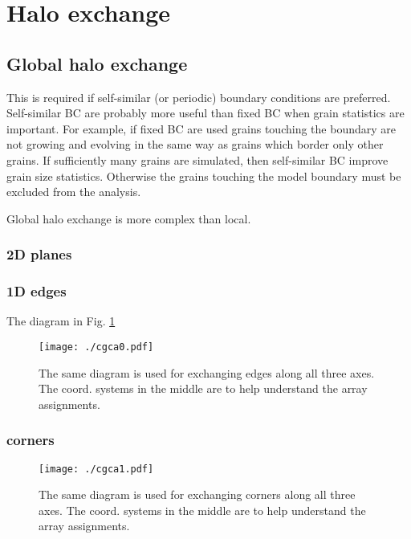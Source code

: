 \section{Halo exchange}

\subsection{Global halo exchange}

This is required if self-similar (or periodic) boundary
conditions are preferred.
Self-similar BC are probably more useful than
fixed BC when grain statistics are important.
For example, if fixed BC are used grains touching
the boundary are not growing and evolving in the
same way as grains which border only other grains.
If sufficiently many grains are simulated, then
self-similar BC improve grain size statistics.
Otherwise the grains touching the model boundary
must be excluded from the analysis.

Global halo exchange is more complex than local.

\subsubsection{2D planes}

\subsubsection{1D edges}

The diagram in Fig. \ref{fig:cgca0}

\begin{figure}
\centerline{\texttt{[image: ./cgca0.pdf]}}
\caption{The same diagram is used for exchanging edges
along all three axes.
The coord. systems in the middle are to help understand
the array assignments.}
\label{fig:cgca0}
\end{figure}

\subsubsection{corners}

\begin{figure}
\centerline{\texttt{[image: ./cgca1.pdf]}}
\caption{The same diagram is used for exchanging corners
along all three axes.
The coord. systems in the middle are to help understand
the array assignments.}
\label{fig:cgca1}
\end{figure}
